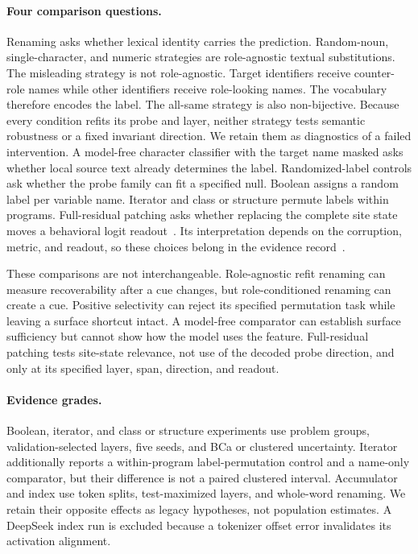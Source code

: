 \documentclass{article}
\begin{document}
\paragraph{Four comparison questions.}
Renaming asks whether lexical identity carries the prediction. Random-noun,
single-character, and numeric strategies are role-agnostic textual
substitutions. The misleading strategy is not role-agnostic. Target
identifiers receive counter-role names while other identifiers receive
role-looking names. The vocabulary therefore encodes the label. The all-same
strategy is also non-bijective. Because every condition refits its probe and
layer, neither strategy tests semantic robustness or a fixed invariant
direction. We retain them as diagnostics of a failed intervention. A
model-free character classifier with the target name masked asks whether local
source text already determines the label. Randomized-label controls ask
whether the probe family can fit a specified null. Boolean assigns a random
label per variable name. Iterator and class or structure permute labels within
programs. Full-residual patching asks whether replacing the complete site state
moves a behavioral logit readout~\citep{meng2022locating}. Its interpretation
depends on the corruption, metric, and readout, so these choices belong in the
evidence record~\citep{zhang2023patching,heimersheim2024patching}.

These comparisons are not interchangeable. Role-agnostic refit renaming can
measure recoverability after a cue changes, but role-conditioned renaming can
create a cue. Positive selectivity can reject its specified permutation task
while leaving a surface shortcut intact. A model-free comparator can establish
surface sufficiency but cannot show how the model uses the feature.
Full-residual patching tests site-state relevance, not use of the decoded probe
direction, and only at its specified layer, span, direction, and readout.

\paragraph{Evidence grades.}
Boolean, iterator, and class or structure experiments use problem groups,
validation-selected layers, five seeds, and BCa or clustered uncertainty.
Iterator additionally reports a within-program label-permutation control and
a name-only comparator, but their difference is not a paired clustered
interval. Accumulator and index use token splits, test-maximized layers, and
whole-word renaming. We retain their opposite effects as legacy hypotheses,
not population estimates. A DeepSeek index run is excluded because a tokenizer
offset error invalidates its activation alignment.
\end{document}
